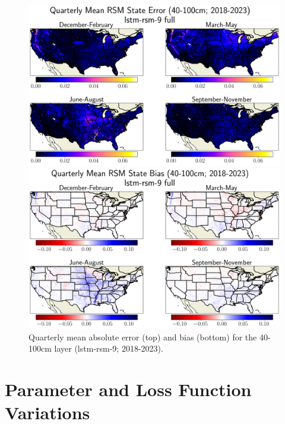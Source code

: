 \begin{figure}[hp!]
    \centering

    \includegraphics[width=.99\linewidth,draft=false]{figures/grid-eval_qtrly/eval-grid_full_lstm-rsm-9_pixelwise-time-stats_abs-err_qtrly-err-state-rsm-100.png}


    \includegraphics[width=.99\linewidth,draft=false]{figures/grid-eval_qtrly/eval-grid_full_lstm-rsm-9_pixelwise-time-stats_bias_qtrly-err-state-rsm-100.png}

    \caption{Quarterly mean absolute error (top) and bias (bottom) for the 40-100cm layer (lstm-rsm-9; 2018-2023).}
    \label{bulk-eval_qtrly_rsm-100}
\end{figure}

\newpage

\section{Parameter and Loss Function Variations}

